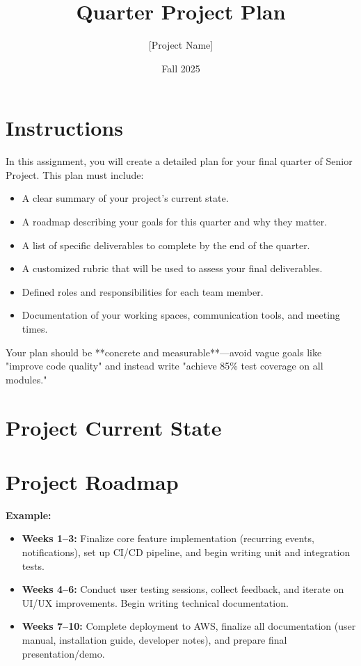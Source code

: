 \documentclass{article}
\title{Quarter Project Plan}
\author{[Project Name]}
\date{Fall 2025}
\begin{document}
\maketitle

\section*{Instructions}
In this assignment, you will create a detailed plan for your final quarter of Senior Project.  
This plan must include:  
\begin{itemize}
    \item A clear summary of your project’s current state.  
    \item A roadmap describing your goals for this quarter and why they matter.  
    \item A list of specific deliverables to complete by the end of the quarter.  
    \item A customized rubric that will be used to assess your final deliverables.  
    \item Defined roles and responsibilities for each team member.  
    \item Documentation of your working spaces, communication tools, and meeting times.  
\end{itemize}

Your plan should be **concrete and measurable**—avoid vague goals like "improve code quality" and instead write "achieve 85\% test coverage on all modules."  


\section*{Project Current State}

\section*{Project Roadmap}

\textbf{Example:}  
\begin{itemize}
    \item \textbf{Weeks 1--3:} Finalize core feature implementation (recurring events, notifications), set up CI/CD pipeline, and begin writing unit and integration tests.  
    \item \textbf{Weeks 4--6:} Conduct user testing sessions, collect feedback, and iterate on UI/UX improvements. Begin writing technical documentation.  
    \item \textbf{Weeks 7--10:} Complete deployment to AWS, finalize all documentation (user manual, installation guide, developer notes), and prepare final presentation/demo.  
\end{itemize}
\end{document}

